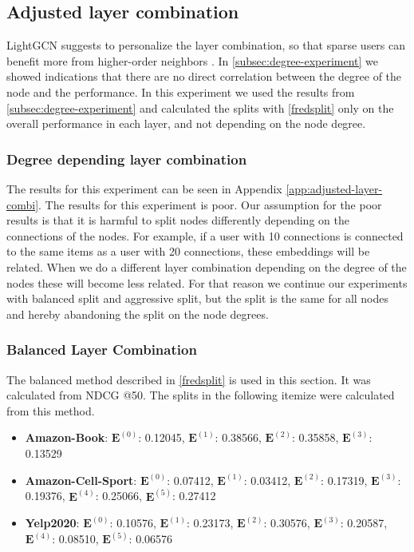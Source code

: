 \subsection{Adjusted layer combination}
LightGCN suggests to personalize the layer combination, so that sparse users can benefit more from higher-order neighbors \cite{lightgcn}.
In \autoref{subsec:degree-experiment} we showed indications that there are no direct correlation between the degree of the node and the performance.
In this experiment we used the results from \autoref{subsec:degree-experiment} and calculated the splits with \autoref{fredsplit} only on the overall performance in each layer, and not depending on the node degree.

\subsubsection{Degree depending layer combination}
The results for this experiment can be seen in Appendix \ref{app:adjusted-layer-combi}.
The results for this experiment is poor.
Our assumption for the poor results is that it is harmful to split nodes differently depending on the connections of the nodes.
For example, if a user with 10 connections is connected to the same items as a user with 20 connections, these embeddings will be related.
When we do a different layer combination depending on the degree of the nodes these will become less related.
For that reason we continue our experiments with balanced split and aggressive split, but the split is the same for all nodes and hereby abandoning the split on the node degrees.

\subsubsection{Balanced Layer Combination}
The balanced method described in \autoref{fredsplit} is used in this section.
It was calculated from NDCG @50.
The splits in the following itemize were calculated from this method.
\begin{itemize}
    \item \textbf{Amazon-Book}: $\mathbf{E}^{(0)}$: 0.12045, $\mathbf{E}^{(1)}$: 0.38566, $\mathbf{E}^{(2)}$: 0.35858, $\mathbf{E}^{(3)}$:  0.13529
    \item \textbf{Amazon-Cell-Sport}: $\mathbf{E}^{(0)}$: 0.07412, $\mathbf{E}^{(1)}$: 0.03412, $\mathbf{E}^{(2)}$: 0.17319, $\mathbf{E}^{(3)}$:  0.19376, $\mathbf{E}^{(4)}$: 0.25066, $\mathbf{E}^{(5)}$: 0.27412
    \item \textbf{Yelp2020}: $\mathbf{E}^{(0)}$: 0.10576, $\mathbf{E}^{(1)}$: 0.23173, $\mathbf{E}^{(2)}$: 0.30576, $\mathbf{E}^{(3)}$: 0.20587, $\mathbf{E}^{(4)}$: 0.08510, $\mathbf{E}^{(5)}$: 0.06576
\end{itemize}

